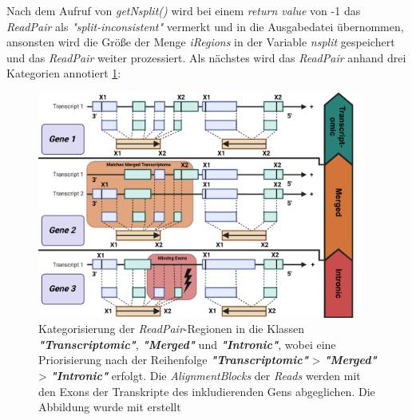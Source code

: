 \documentclass[12pt]{article}
\begin{document}
Nach dem Aufruf von \textit{getNsplit()} wird bei einem \textit{return value} von -1 das \textit{ReadPair} als 
\textit{"split-inconsistent"} vermerkt und in die Ausgabedatei übernommen, ansonsten wird die Grö\ss e der
Menge \textit{iRegions} in der Variable \textit{nsplit} gespeichert und das \textit{ReadPair} weiter prozessiert.
\newpage
Als nächstes wird das \textit{ReadPair} anhand drei Kategorien annotiert \ref{fig:-figures-ReadAnnotation-png}:
\begin{figure}[htpb]
    \centering
    \includegraphics[width=0.95\textwidth]{./figures/ReadAnnotation.png}
\caption{Kategorisierung der \textit{ReadPair}-Regionen in die Klassen \textit{\textbf{"Transcriptomic"}},
\textit{\textbf{"Merged"}} und \textit{\textbf{"Intronic"}}, wobei eine Priorisierung nach 
der Reihenfolge \textit{\textbf{"Transcriptomic"}} > \textit{\textbf{"Merged"}} > \textit{\textbf{"Intronic"}} erfolgt.
Die \textit{AlignmentBlocks} der \textit{Reads} werden mit den Exons der Transkripte des inkludierenden Gens abgeglichen. 
Die Abbildung wurde mit \cite{biorender} erstellt}
    \label{fig:-figures-ReadAnnotation-png}
\end{figure}
\end{document}
